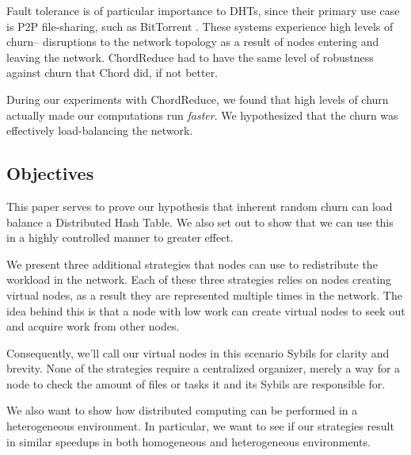 \documentclass[11pt,letterpaper]{article}
\begin{document}
Fault tolerance is of particular importance to DHTs, since their primary use case is P2P file-sharing, such as BitTorrent \cite{bittorrent}.
These systems experience high levels of churn-- disruptions to the network topology as a result of nodes entering and leaving the network.
ChordReduce had to have the same level of robustness against churn that Chord did, if not better.

During our experiments with ChordReduce, we found that high levels of churn actually made our computations run \textit{faster}.
We hypothesized that the churn was effectively load-balancing the network.

\subsection*{Objectives}
This paper serves to prove our hypothesis that inherent random churn can load balance a Distributed Hash Table.
We also set out to show that we can use this in a highly controlled manner to greater effect.

We present three additional strategies that nodes can use to redistribute the workload in the network.
Each of these three strategies relies on nodes creating virtual nodes, as a result they are represented multiple times in the network.
The idea behind this is that a node with low work can create virtual nodes to seek out and acquire work from other nodes.

Consequently, we'll call our virtual nodes in this scenario Sybils for clarity and brevity.
None of the strategies require a centralized organizer, merely a way for a node to check the amount of files or tasks it and its Sybils are responsible for.


We also want to show how distributed computing can be performed in a heterogeneous environment.
In particular, we want to see if our strategies result in similar speedups in both homogeneous and heterogeneous environments.

%
%
\end{document}
